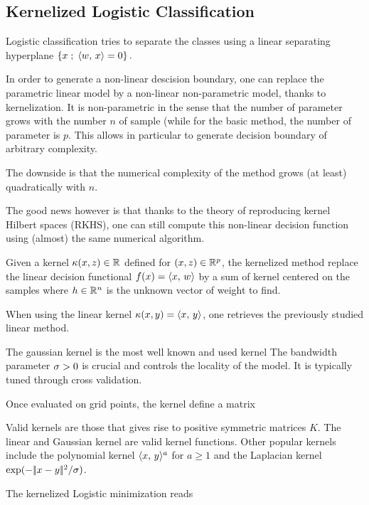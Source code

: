 \subsection{Kernelized Logistic Classification}

Logistic classification tries to separate the classes using
a linear separating hyperplane $ \left\{ x \;;\; \langle w,\,x\rangle=0 \right\}. $

In order to generate a non-linear descision boundary, one can replace the
parametric linear model by a non-linear non-parametric model, thanks to
kernelization. It is non-parametric in the sense that the number of
parameter grows with the number $n$ of sample (while for the basic
method, the number of parameter is $p$. This allows in particular to
generate decision boundary of arbitrary complexity.

The downside is that the numerical complexity of the method grows
(at least) quadratically with $n$.

The good news however is that thanks to the theory of reproducing kernel Hilbert spaces
(RKHS), one can still compute this non-linear decision
function using (almost) the same numerical algorithm.

Given a kernel $ \kappa(x,z) \in \mathbb{R} $ defined for $(x,z) \in \mathbb{R}^p$,
the kernelized method replace the linear decision functional $f(x) =
\langle x,\,w\rangle$ by a sum of kernel centered on the samples
where $h \in \mathbb{R}^n$ is the unknown vector of weight to find.

When using the linear kernel $\kappa(x,y)=\langle x,\,y\rangle$, one retrieves
the previously studied linear method.


The gaussian kernel is the most well known and used kernel
The bandwidth parameter $\sigma>0$ is crucial and controls the locality of
the model. It is typically tuned through cross validation.


Once evaluated on grid points, the kernel define a matrix

Valid kernels are those that gives rise to positive symmetric matrices
$K$. The linear and Gaussian kernel are valid kernel functions. Other
popular kernels include the polynomial kernel $ \langle x,\,y\rangle^a $ for $a
\geq 1$ and the Laplacian kernel $ \exp( -|\!| x-y |\!|^2/\sigma ) $.

The kernelized Logistic minimization reads

